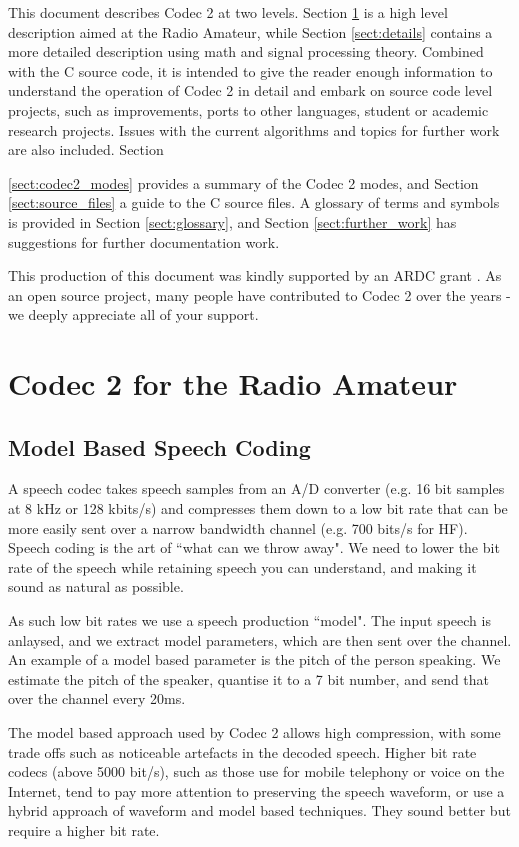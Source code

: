 \documentclass{article}
\begin{document}
This document describes Codec 2 at two levels.  Section \ref{sect:overview} is a high level description aimed at the Radio Amateur, while Section \ref{sect:details} contains a more detailed description using math and signal processing theory.  Combined with the C source code, it is intended to give the reader enough information to understand the operation of Codec 2 in detail and embark on source code level projects, such as improvements, ports to other languages, student or academic research projects.  Issues with the current algorithms and topics for further work are also included.  Section {\ref{sect:codec2_modes} provides a summary of the Codec 2 modes, and Section \ref{sect:source_files} a guide to the C source files.  A glossary of terms and symbols is provided in Section \ref{sect:glossary}, and Section \ref{sect:further_work} has suggestions for further documentation work.

This production of this document was kindly supported by an ARDC grant \cite{ardc2023}.  As an open source project, many people have contributed to Codec 2 over the years - we deeply appreciate all of your support.

\section{Codec 2 for the Radio Amateur}
\label{sect:overview}

\subsection{Model Based Speech Coding}

A speech codec takes speech samples from an A/D converter (e.g. 16 bit samples at 8 kHz or 128 kbits/s) and compresses them down to a low bit rate that can be more easily sent over a narrow bandwidth channel (e.g. 700 bits/s for HF).  Speech coding is the art of ``what can we throw away". We need to lower the bit rate of the speech while retaining speech you can understand, and making it sound as natural as possible.

As such low bit rates we use a speech production ``model".  The input speech is anlaysed, and we extract model parameters, which are then sent over the channel.  An example of a model based parameter is the pitch of the person speaking.  We estimate the pitch of the speaker, quantise it to a 7 bit number, and send that over the channel every 20ms.

The model based approach used by Codec 2 allows high compression, with some trade offs such as noticeable artefacts in the decoded speech.  Higher bit rate codecs (above 5000 bit/s), such as those use for mobile telephony or voice on the Internet, tend to pay more attention to preserving the speech waveform, or use a hybrid approach of waveform and model based techniques.  They sound better but require a higher bit rate.

}
\end{document}
